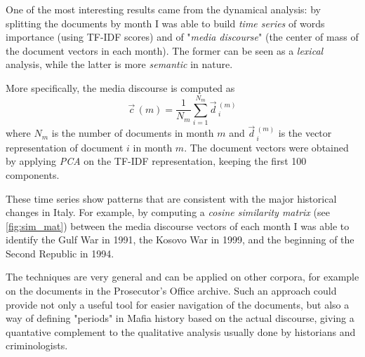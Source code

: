 One of the most interesting results came from the dynamical analysis: by splitting the documents by month I was able to build \textit{time series} of words importance (using TF-IDF scores) and of "\textit{media discourse}" (the center of mass of the document vectors in each month). The former can be seen as a \textit{lexical} analysis, while the latter is more \textit{semantic} in nature.

More specifically, the media discourse is computed as
\begin{equation}
    \vec{c}\,(m) = \frac{1}{N_m} \sum_{i = 1}^{N_m} \vec{d}\,_i^{(m)}
\end{equation}
where $N_m$ is the number of documents in month $m$ and $\vec{d}\,_i^{(m)}$ is the vector representation of document $i$ in month $m$. The document vectors were obtained by applying \textit{PCA} on the TF-IDF representation, keeping the first 100 components.

These time series show patterns that are consistent with the major historical changes in Italy. For example, by computing a \textit{cosine similarity matrix} (see \autoref{fig:sim_mat}) between the media discourse vectors of each month I was able to identify the Gulf War in 1991, the Kosovo War in 1999, and the beginning of the Second Republic in 1994.




The techniques are very general and can be applied on other corpora, for example on the documents in the Prosecutor's Office archive. Such an approach could provide not only a useful tool for easier navigation of the documents, but also a way of defining "periods" in Mafia history based on the actual discourse, giving a quantative complement to the qualitative analysis usually done by historians and criminologists.
